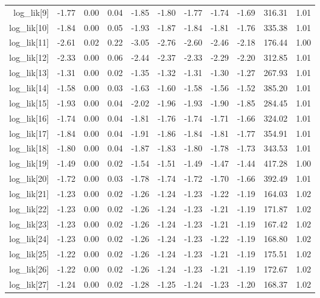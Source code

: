 \begin{table}[ht]
\begin{tabular}{rrrrrrrrrrr}
  log\_lik[9] & -1.77 & 0.00 & 0.04 & -1.85 & -1.80 & -1.77 & -1.74 & -1.69 & 316.31 & 1.01 \\ 
  log\_lik[10] & -1.84 & 0.00 & 0.05 & -1.93 & -1.87 & -1.84 & -1.81 & -1.76 & 335.38 & 1.01 \\ 
  log\_lik[11] & -2.61 & 0.02 & 0.22 & -3.05 & -2.76 & -2.60 & -2.46 & -2.18 & 176.44 & 1.00 \\ 
  log\_lik[12] & -2.33 & 0.00 & 0.06 & -2.44 & -2.37 & -2.33 & -2.29 & -2.20 & 312.85 & 1.01 \\ 
  log\_lik[13] & -1.31 & 0.00 & 0.02 & -1.35 & -1.32 & -1.31 & -1.30 & -1.27 & 267.93 & 1.01 \\ 
  log\_lik[14] & -1.58 & 0.00 & 0.03 & -1.63 & -1.60 & -1.58 & -1.56 & -1.52 & 385.20 & 1.01 \\ 
  log\_lik[15] & -1.93 & 0.00 & 0.04 & -2.02 & -1.96 & -1.93 & -1.90 & -1.85 & 284.45 & 1.01 \\ 
  log\_lik[16] & -1.74 & 0.00 & 0.04 & -1.81 & -1.76 & -1.74 & -1.71 & -1.66 & 324.02 & 1.01 \\ 
  log\_lik[17] & -1.84 & 0.00 & 0.04 & -1.91 & -1.86 & -1.84 & -1.81 & -1.77 & 354.91 & 1.01 \\ 
  log\_lik[18] & -1.80 & 0.00 & 0.04 & -1.87 & -1.83 & -1.80 & -1.78 & -1.73 & 343.53 & 1.01 \\ 
  log\_lik[19] & -1.49 & 0.00 & 0.02 & -1.54 & -1.51 & -1.49 & -1.47 & -1.44 & 417.28 & 1.00 \\ 
  log\_lik[20] & -1.72 & 0.00 & 0.03 & -1.78 & -1.74 & -1.72 & -1.70 & -1.66 & 392.49 & 1.01 \\ 
  log\_lik[21] & -1.23 & 0.00 & 0.02 & -1.26 & -1.24 & -1.23 & -1.22 & -1.19 & 164.03 & 1.02 \\ 
  log\_lik[22] & -1.23 & 0.00 & 0.02 & -1.26 & -1.24 & -1.23 & -1.21 & -1.19 & 171.87 & 1.02 \\ 
  log\_lik[23] & -1.23 & 0.00 & 0.02 & -1.26 & -1.24 & -1.23 & -1.21 & -1.19 & 167.42 & 1.02 \\ 
  log\_lik[24] & -1.23 & 0.00 & 0.02 & -1.26 & -1.24 & -1.23 & -1.22 & -1.19 & 168.80 & 1.02 \\ 
  log\_lik[25] & -1.22 & 0.00 & 0.02 & -1.26 & -1.24 & -1.23 & -1.21 & -1.19 & 175.51 & 1.02 \\ 
  log\_lik[26] & -1.22 & 0.00 & 0.02 & -1.26 & -1.24 & -1.23 & -1.21 & -1.19 & 172.67 & 1.02 \\ 
  log\_lik[27] & -1.24 & 0.00 & 0.02 & -1.28 & -1.25 & -1.24 & -1.23 & -1.20 & 168.37 & 1.02 \\ 

\end{tabular}
\end{table}
